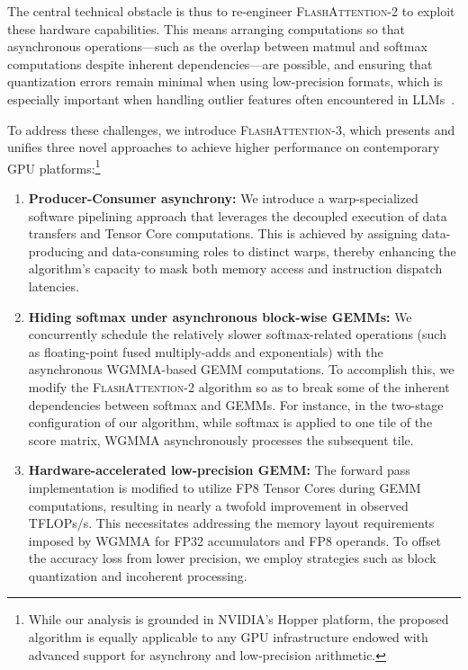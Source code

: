 The central technical obstacle is thus to re-engineer \textsc{FlashAttention-2} to exploit these hardware capabilities. This means arranging computations so that asynchronous operations—such as the overlap between matmul and softmax computations despite inherent dependencies—are possible, and ensuring that quantization errors remain minimal when using low-precision formats, which is especially important when handling outlier features often encountered in LLMs~\citep{dettmers2208llm, sun2024massive}.

To address these challenges, we introduce \textsc{FlashAttention-3}, which presents and unifies three novel approaches to achieve higher performance on contemporary GPU platforms:\footnote{While our analysis is grounded in NVIDIA's Hopper platform, the proposed algorithm is equally applicable to any GPU infrastructure endowed with advanced support for asynchrony and low-precision arithmetic.}

\begin{enumerate}

\item \textbf{Producer-Consumer asynchrony:} We introduce a warp-specialized software pipelining approach that leverages the decoupled execution of data transfers and Tensor Core computations. This is achieved by assigning data-producing and data-consuming roles to distinct warps, thereby enhancing the algorithm's capacity to mask both memory access and instruction dispatch latencies.

\item \textbf{Hiding softmax under asynchronous block-wise GEMMs:} We concurrently schedule the relatively slower softmax-related operations (such as floating-point fused multiply-adds and exponentials) with the asynchronous WGMMA-based GEMM computations. To accomplish this, we modify the \textsc{FlashAttention-2} algorithm so as to break some of the inherent dependencies between softmax and GEMMs. For instance, in the two-stage configuration of our algorithm, while softmax is applied to one tile of the score matrix, WGMMA asynchronously processes the subsequent tile.

\item \textbf{Hardware-accelerated low-precision GEMM:} The forward pass implementation is modified to utilize FP8 Tensor Cores during GEMM computations, resulting in nearly a twofold improvement in observed TFLOPs/s. This necessitates addressing the memory layout requirements imposed by WGMMA for FP32 accumulators and FP8 operands. To offset the accuracy loss from lower precision, we employ strategies such as block quantization and incoherent processing.
\end{enumerate}

